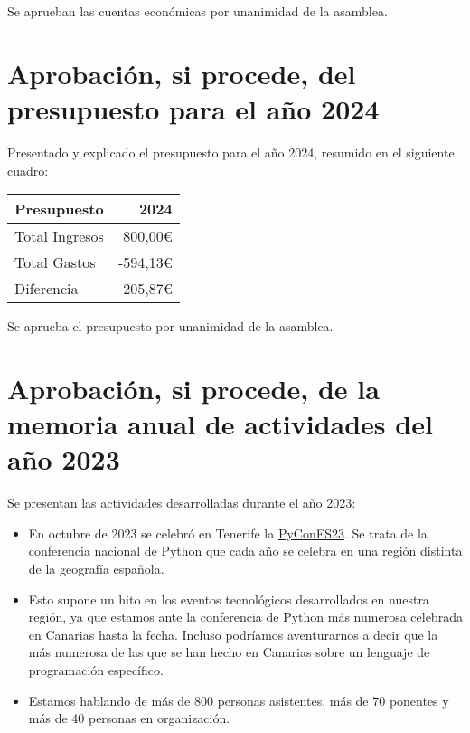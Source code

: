 \documentclass[a4paper,12pt]{article}
\begin{document}
Se aprueban las cuentas económicas por unanimidad de la asamblea.

\section{Aprobación, si procede, del presupuesto para el año 2024}

Presentado y explicado el presupuesto para el año 2024, resumido
en el siguiente cuadro:

\begin{center}
    \begin{tabular}{ | l | r | }
        \hline
        \textbf{Presupuesto} & \textbf{2024} \\ 
        \hline
        Total Ingresos & 800,00\euro \\  
        \hline
        Total Gastos & -594,13\euro \\  
        \hline
        \hline
        Diferencia & 205,87\euro \\  
        \hline
    \end{tabular}
\end{center}

Se aprueba el presupuesto por unanimidad de la asamblea.

\section{Aprobación, si procede, de la memoria anual de actividades del año 2023}

Se presentan las actividades desarrolladas durante el año 2023:

\begin{itemize}
    \item En octubre de 2023 se celebró en Tenerife la \href{https://2023.es.pycon.org/}{PyConES23}. Se trata de la conferencia nacional de Python que cada año se celebra en una región distinta de la geografía española.
    \item Esto supone un hito en los eventos tecnológicos desarrollados en nuestra región, ya que estamos ante la conferencia de Python más numerosa celebrada en Canarias hasta la fecha. Incluso podríamos aventurarnos a decir que la más numerosa de las que se han hecho en Canarias sobre un lenguaje de programación específico.
    \item Estamos hablando de más de 800 personas asistentes, más de 70 ponentes y más de 40 personas en organización.
\end{itemize}
\end{document}
